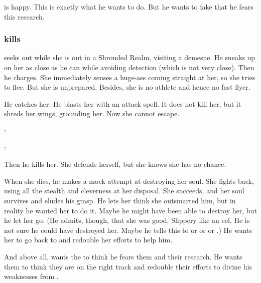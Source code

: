 \Ishnaruchaefir{} is happy. 
This is exactly what he wants \Teshrial{} to do. 
But he wants to fake that he fears this research. 






\subsubsection{\Ishnaruchaefir kills \Urizeth}
\Ishnaruchaefir{} seeks out \Urizeth{} while she is out in a Shrouded Realm, visiting a demesne. 
He sneaks up on her as close as he can while avoiding detection (which is not very close). 
Then he charges. 
She immediately senses a huge-ass \vertex{} coming straight at her, so she tries to flee. 
But she is unprepared. 
Besides, she is no athlete and hence no fast flyer. 

He catches her. 
He blasts her with an attack spell. 
It does not kill her, but it shreds her wings, grounding her. 
Now she cannot escape. 

\begin{prose}
  \Urizeth: 

  \Ishnaruchaefir: 
\end{prose}

Then he kills her. 
She defends herself, but she knows she has no chance. 

When she dies, he makes a mock attempt at destroying her soul. 
She fights back, using all the \TiphredSerah{} stealth and cleverness at her disposal. 
She succeeds, and her soul survives and eludes his grasp.
He lets her think she outsmarted him, but in reality he wanted her to do it. 
Maybe he might have been able to destroy her, but he let her go. 
(He admits, though, that she was good. Slippery like an eel. He is not sure he could have destroyed her. Maybe he tells this to \Secherdamon{} or \Nzessuacrith{} or \Menessiaraid{} or \Criseis.) 
He wants her to go back to \Teshrial{} and redouble her efforts to help him. 

And above all, \Ishnaruchaefir{} wants the \resphain{} to think he fears them and their research. 
He wants them to think they are on the right track and redouble their efforts to divine his weaknesses from \WanderersInDarknessEmph. 

